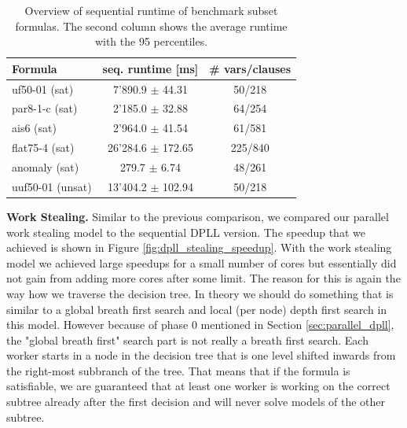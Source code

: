 \documentclass[letterpaper]{article}
\newcommand{\mypar}[1]{{\bf #1.}}
\begin{document}
\begin{table}[h!]
    \centering
    \begin{tabularx}{\columnwidth}{|X|c|c|}
        \hline
        Formula & seq. runtime [ms] & \# vars/clauses\\
        \hline
        \hline
        uf50-01 (sat) & 7'890.9 $\pm$ 44.31 & 50/218\\
        \hline
        par8-1-c (sat) & 2'185.0 $\pm$ 32.88 & 64/254\\
        \hline
        ais6 (sat) &  2'964.0 $\pm$ 41.54 & 61/581\\
        \hline
        flat75-4 (sat) & 26'284.6 $\pm$ 172.65 & 225/840\\
        \hline
        anomaly (sat) & 279.7 $\pm$ 6.74 & 48/261\\
        \hline
        uuf50-01 (unsat) & 13'404.2 $\pm$ 102.94 & 50/218\\
        \hline
    \end{tabularx}
    \caption{Overview of sequential runtime of benchmark subset formulas.
    The second column shows the average runtime with the 95 percentiles.}
    \label{tab:cnfs_representatives}
\end{table}

\mypar{Work Stealing}
Similar to the previous comparison, we compared our parallel work stealing model to the sequential DPLL version.
The speedup that we achieved is shown in Figure \ref{fig:dpll_stealing_speedup}.
With the work stealing model we achieved large speedups for a small number of cores but essentially did not gain from adding more cores after some limit.
The reason for this is again the way how we traverse the decision tree.
In theory we should do something that is similar to a global breath first search and local (per node) depth first search in this model.
However because of phase 0 mentioned in Section \ref{sec:parallel_dpll}, the "global breath first" search part is not really a breath first search.
Each worker starts in a node in the decision tree that is one level shifted inwards from the right-most subbranch of the tree.
That means that if the formula is satisfiable, we are guaranteed that at least one worker is working on the correct subtree already after the first decision and will never solve models of the other subtree.
\end{document}
